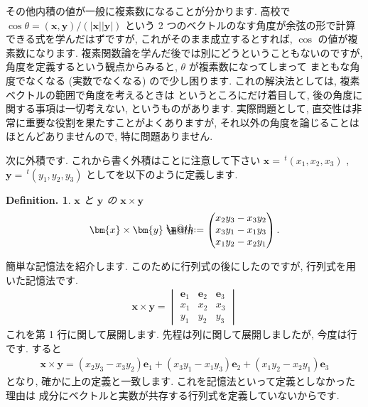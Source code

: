 \documentclass[openany, a4paper, oneside]{book}
\makeatletter
\newcommand*{\defeq}{\mathrel{\rlap{%
\raisebox{0.3ex}{$\m@th\cdot$}}%
\raisebox{-0.3ex}{$\m@th\cdot$}}%
=}
\theoremstyle{break}
\theoremstyle{breakdefn}
\newtheorem{defn}[thm]{Definition.}
\newcommand{\bbR}{\mathbb{R}}
\makeatother
\begin{document}
その他内積の値が一般に複素数になることが分かります.
高校で
$\cos \theta = ( \bm{x} , \bm{y} ) / ( | \bm{x} | | \bm{y} | )$
という 2 つのベクトルのなす角度が余弦の形で計算できる式を学んだはずですが,
これがそのまま成立するとすれば,  $\cos$ の値が複素数になります.
複素関数論を学んだ後では別にどうということもないのですが,
角度を定義するという観点からみると,  $\theta$ が複素数になってしまって
まともな角度でなくなる (実数でなくなる) ので少し困ります.
これの解決法としては, 複素ベクトルの範囲で角度を考えるときは
というところにだけ着目して,
後の角度に関する事項は一切考えない, というものがあります.
実際問題として, 直交性は非常に重要な役割を果たすことがよくありますが,
それ以外の角度を論じることはほとんどありませんので, 特に問題ありません.

次に外積です. これから書く外積は\textgt{ $\bbR^3$ のときにしか定義されない}ことに注意して下さい
$\bm{x}=\, ^{t}(x_{1},x_{2},x_{3})$ ,  $\bm{y}=\, ^t (y_{1},y_{2},y_{3})$ としてを以下のように定義します.
\begin{defn} $\bm{x}$ と $\bm{y}$ の $\bm{x} \times \bm{y}$
\begin{align}
\bm{x} \times \bm{y} \defeq \begin{pmatrix} x_{2}y_{3} - x_{3}y_{2} \\
x_{3}y_{1} - x_{1}y_{3} \\
x_{1}y_{2} - x_{2}y_{1}
\end{pmatrix}.
\end{align}
\end{defn}
簡単な記憶法を紹介します. このために行列式の後にしたのですが, 行列式を用いた記憶法です.
\begin{align}
 \bm{x} \times \bm{y}
 =
 \begin{vmatrix}
   \bm{e}_{1} & \bm{e}_{2} & \bm{e}_{3} \\
   x_{1} & x_{2} & x_{3} \\
   y_{1} & y_{2} & y_{3}
 \end{vmatrix}
\end{align}
これを第 1 行に関して展開します. 先程は列に関して展開しましたが, 今度は行です. すると
\begin{align}
 \bm{x} \times \bm{y}
 =
 (x_{2}y_{3} - x_{3}y_{2})\bm{e}_{1}
 +(x_{3}y_{1} - x_{1}y_{3}) \bm{e}_{2}
 +(x_{1}y_{2} - x_{2}y_{1}) \bm{e}_{3}
\end{align}
となり, 確かに上の定義と一致します. これを記憶法といって定義としなかった理由は
成分にベクトルと実数が共存する行列式を定義していないからです.
\end{document}
